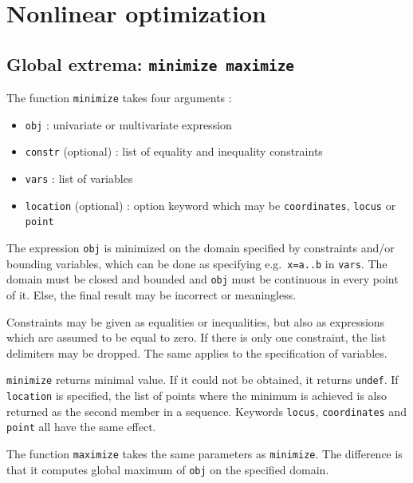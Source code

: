 \documentclass[a4paper,11pt]{book}
\begin{document}
\section{Nonlinear optimization}

\subsection{Global extrema: {\tt minimize maximize}}

The function {\tt minimize} takes four arguments :
\begin{itemize}
\item {\tt obj} : univariate or multivariate expression
\item {\tt constr} (optional) : list of equality and inequality constraints
\item {\tt vars} : list of variables
\item {\tt location} (optional) : option keyword which may be {\tt coordinates}, {\tt locus} or {\tt point}
\end{itemize}
The expression {\tt obj} is minimized on the domain specified by constraints and/or bounding variables, which can be done as specifying e.g.~{\tt x=a..b} in {\tt vars}. The domain must be closed and bounded and {\tt obj} must be continuous in every point of it. Else, the final result may be incorrect or meaningless.

Constraints may be given as equalities or inequalities, but also as expressions which are assumed to be equal to zero. If there is only one constraint, the list delimiters may be dropped. The same applies to the specification of variables.

{\tt minimize} returns minimal value. If it could not be obtained, it returns {\tt undef}. If {\tt location} is specified, the list of points where the minimum is achieved is also returned as the second member in a sequence. Keywords {\tt locus}, {\tt coordinates} and {\tt point} all have the same effect.

The function {\tt maximize} takes the same parameters as {\tt minimize}. The difference is that it computes global maximum of {\tt obj} on the specified domain.
\end{document}
